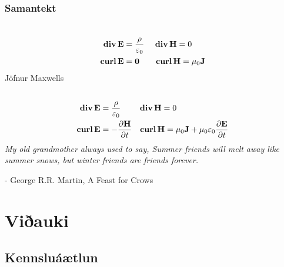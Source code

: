 \documentclass[a4paper,10pt,icelandic]{sphinxmanual}
\begin{document}
\subsection{Samantekt}
\label{Kafli6:samantekt}\begin{gather}
\begin{split}\displaystyle\end{split}\notag\\\begin{split}\begin{aligned}
  \mbox{${\rm\bf div\,}$}\mbox{${\bf E}$}&= \frac{\rho}{\varepsilon_0} \quad~ \mbox{${\rm\bf div\,}$}\mbox{${\bf H}$}= 0 \\
  \mbox{${\rm\bf curl\,}$}\mbox{${\bf E}$}&= \mathbf{0} \qquad \mbox{${\rm\bf curl\,}$}\mbox{${\bf H}$}= \mu_0 \mathbf{J}
 \end{aligned}\end{split}\notag
\end{gather}
Jöfnur Maxwells
\begin{gather}
\begin{split}\displaystyle\end{split}\notag\\\begin{split}\begin{aligned}
  \mbox{${\rm\bf div\,}$}\mbox{${\bf E}$}&= \frac{\rho}{\varepsilon_0} \qquad ~ \mbox{${\rm\bf div\,}$}\mbox{${\bf H}$}= 0 \\
  \mbox{${\rm\bf curl\,}$}\mbox{${\bf E}$}&= -\frac{\partial \mbox{${\bf H}$}}{\partial t} \quad \mbox{${\rm\bf curl\,}$}\mbox{${\bf H}$}= \mu_0 \mathbf{J} + \mu_0 \varepsilon_0  \frac{\partial\mbox{${\bf E}$}}{\partial t}
 \end{aligned}\end{split}\notag
\end{gather}
\emph{My old grandmother always used to say, Summer friends will melt away like summer snows, but winter friends are friends forever.}

- George R.R. Martin, A Feast for Crows


\chapter{Viðauki}
\label{vidauki::doc}\label{vidauki:viauki}




\section{Kennsluáætlun}
\label{vidauki:kennsluaaetlun}
\end{document}
